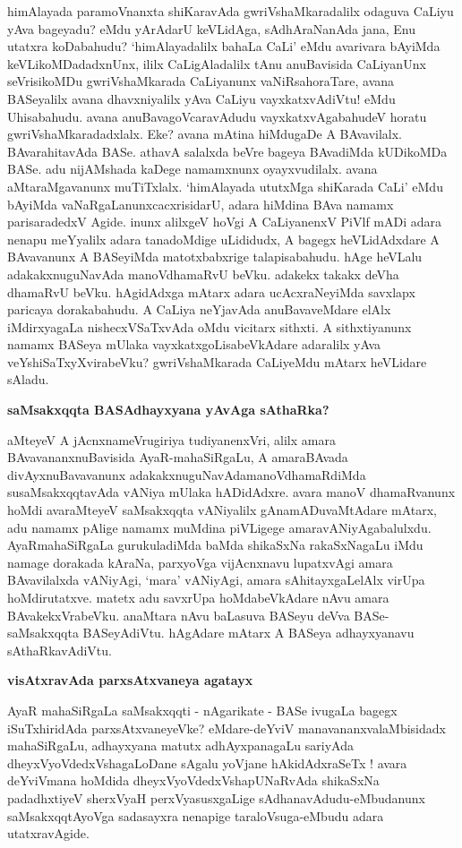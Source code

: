 himAlayada paramoVnanxta shiKaravAda gwriVshaMkaradalilx odaguva CaLiyu yAva bageyadu? eMdu yArAdarU keVLidAga, sAdhAraNanAda jana, Enu utatxra koDabahudu?  `himAlayadalilx bahaLa CaLi' eMdu avarivara bAyiMda keVLikoMDadadxnUnx, ililx CaLigAladalilx tAnu anuBavisida CaLiyanUnx seVrisikoMDu gwriVshaMkarada CaLiyanunx vaNiRsahoraTare, avana BASeyalilx avana dhavxni\-yalilx yAva CaLiyu vayxkatxvAdiVtu! eMdu Uhisabahudu. avana anuBavagoVcaravAdudu vayxkatx\-vAga\-bahudeV horatu gwriVshaMkaradadxlalx. Eke? avana mAtina hiMdugaDe A BAvavilalx. BAva\-rahita\-vAda BASe. athavA salalxda beVre bageya BAvadiMda kUDikoMDa BASe. adu nijAMshada kaDege \-namamxnunx oyayxvudilalx. avana aMtaraMgavanunx muTiTxlalx. `himAlayada ututxMga shiKarada CaLi' eMdu bAyiMda\- vaNaRgaLanunxcacxrisidarU, adara hiMdina BAva namamx parisaradedxV Agide. inunx alilxgeV hoVgi A CaLi\-yanenxV PiVlf mADi adara nenapu meYyalilx adara tanadoMdige uLididudx, A bagegx heVLidAdxdare A BAva\-vanunx A BASeyiMda matotxbabxrige talapisabahudu. hAge heVLalu adakakxnuguNavAda manoV\-dhamaRvU beVku. adakekx takakx deVha dhamaRvU beVku. hAgidAdxga mAtarx adara ucAcxraNeyiMda savxlapx pari\-caya dorakabahudu. A CaLiya neYjavAda anuBavaveMdare elAlx iMdirxyagaLa nishecxVSaTxvAda oMdu vicitarx sithxti. A sithxtiyanunx namamx BASeya mUlaka vayxkatxgoLisabeVkAdare adaralilx yAva veYshiSaTxyXvirabeVku? gwriVshaMkarada CaLiyeMdu mAtarx heVLidare sAladu.

{\bigskip
\noindent
{\large\bf saMsakxqqta BASAdhayxyana yAvAga sAthaRka?}}\label{page27}
\medskip

\noindent
aMteyeV A jAcnxnameVrugiriya tudiyanenxVri, alilx amara BAvavananxnu\-Bavisida AyaR-maha\-SiRgaLu, A amaraBAvada divAyxnuBavavanunx adakakxnuguNavAda\break manoVdhamaRdiMda susaMsakxqqtavAda vANiya mUlaka hADidAdxre. avara manoV dhamaRvanunx hoMdi avaraMteyeV saMsakxqqta vANiyalilx \-gAnamADu\-vaMtAdare mAtarx, adu namamx pAlige namamx muMdina piVLigege amaravANiyAgabalulxdu. \-AyaR\-mahaSiRgaLa gurukuladiMda baMda shikaSxNa rakaSxNagaLu iMdu namage dora\-kada kAraNa, parxyoVga
vijAcnx\-navu lupatxvAgi amara BAvavilalxda vANiyAgi, `mara' vANiyAgi, amara sAhitayxgaLelAlx virUpa hoMdirutatxve. matetx adu savxrUpa hoMdabeVkAdare nAvu amara BAvakekxVrabeVku. anaMtara nAvu baLasuva BASeyu deVva BASe-saMsakxqqta BASeyAdiVtu. hAgAdare mAtarx A BASeya adhayx\-yanavu sAthaRkavAdiVtu.

{\bigskip
\noindent
{\large\bf visAtxravAda parxsAtxvaneya agatayx}}\label{page27a}
\medskip

\noindent
AyaR mahaSiRgaLa saMsakxqqti - nAgarikate - BASe ivugaLa bagegx iSuTxhiridAda parxsAtxvaneyeVke? eMdare-deYviV manavananxvalaMbisidadx mahaSiRgaLu, adhayxyana matutx adhAyxpanagaLu sariyAda dheyxVyoV\-dedxVsha\-gaLoDane sAgalu yoVjane hAkidAdxraSeTx ! avara deYviVmana hoMdida dheyxVyoVdedxVsha\-pUNaR\-vAda shikaSxNa padadhxtiyeV sherxVyaH perxVyasusxgaLige sAdhanavAdudu-eMbudanunx saMsakxqqtAyoVga sadasayxra nena\-pige taraloVsuga-eMbudu adara utatxravAgide.

